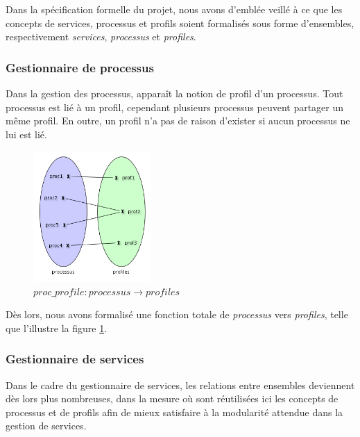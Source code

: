 \documentclass[french, titlepage, 10pt, a4paper]{article}
\begin{document}
Dans la spécification formelle du projet, nous avons d'emblée veillé à ce que
les concepts de services, processus et profils soient formalisés sous forme
d'ensembles, respectivement \emph{services}, \emph{processus} et
\emph{profiles}.

\subsubsection{Gestionnaire de processus}

Dans la gestion des processus, apparaît la notion de profil d'un processus.
Tout processus est lié à un profil, cependant plusieurs processus peuvent
partager un même profil.
En outre, un profil n'a pas de raison d'exister si aucun processus ne lui est
lié.

\begin{figure}[htb]
  \centering
  \includegraphics[width=0.4\textwidth]{proc_profile.png}
  \caption{$proc\_profile: processus \rightarrow profiles$}
  \label{fig:proc_profile}
\end{figure}

Dès lors, nous avons formalisé une fonction totale de \emph{processus} vers
\emph{profiles}, telle que l'illustre la figure \ref{fig:proc_profile}.

\subsubsection{Gestionnaire de services}

Dans le cadre du gestionnaire de services, les relations entre ensembles
deviennent dès lors plus nombreuses, dans la mesure où sont réutilisées ici les
concepts de processus et de profils afin de mieux satisfaire à la modularité
attendue dans la gestion de services.
\end{document}
